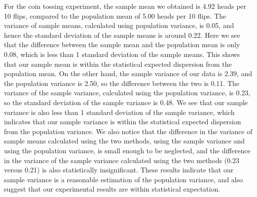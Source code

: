\documentclass[11pt]{book}
\theoremstyle{break}
\theoremstyle{break}
\begin{document}
For the coin tossing experiment, the sample mean we obtained is 4.92 heads per 10 flips, compared to the population mean of 5.00 heads per 10 flips. The variance of sample means, calculated using population variance, is 0.05, and hence the standard deviation of the sample means is around 0.22. Here we see that the difference between the sample mean and the population mean is only 0.08, which is less than 1 standard deviation of the sample means. This shows that our sample mean is within the statistical expected dispersion from the population mean. On the other hand, the sample variance of our data is 2.39, and the population variance is 2.50, so the difference between the two is 0.11. The variance of the sample variance, calculated using the population variance, is 0.23, so the standard deviation of the sample variance is 0.48.  We see that our sample variance is also less than 1 standard deviation of the sample variance, which indicates that our sample variance is within the statistical expected dispersion from the population variance. We also notice that the difference in the variance of sample means calculated using the two methods, using the sample variance and using the population variance, is small enough to be neglected, and the difference in the variance of the sample variance calculated using the two methods (0.23 versus 0.21) is also statistically insignificant. These results indicate that our sample variance is a reasonable estimation of the population variance, and also suggest that our experimental results are within statistical expectation. \\
\end{document}
